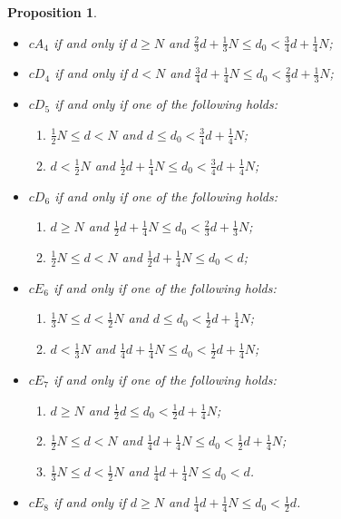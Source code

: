 \documentclass[a4paper,11pt]{amsart}
\newtheorem{prop}[thm]{Proposition}
\theoremstyle{definition}
\theoremstyle{remark}
\numberwithin{equation}{section}
\begin{document}
\begin{prop}
\begin{enumerate}
\begin{itemize}
			\item $cA_4$ if and only if $d \geq N$ and $\frac23d + \frac13 N \le d_0 < \frac34d + \frac14 N$;
            
            \item $cD_4$ if and only if $d<N$ and $\frac{3}{4}d+\frac{1}{4}N\leq d_0<\frac{2}{3}d+\frac{1}{3}N$;
            
            \item $cD_5$ if and only if one of the following holds:
            \begin{enumerate}
                \item $\frac{1}{2}N\leq d<N$ and $d\leq d_0<\frac{3}{4}d+\frac{1}{4}N$;
                \item $d<\frac{1}{2}N$ and $\frac{1}{2}d+\frac{1}{4}N\leq d_0<\frac{3}{4}d+\frac{1}{4}N$; 
            \end{enumerate}
            
			\item $cD_6$ if and only if one of the following holds:
            \begin{enumerate}
                \item $d\geq N$ and $\frac12d + \frac14 N \le d_0 < \frac23d + \frac13 N$;
                \item $\frac{1}{2}N\leq d<N$ and $\frac{1}{2}d+\frac{1}{4}N\leq d_0<d$;
            \end{enumerate}
			
            \item $cE_6$ if and only if one of the following holds:
            \begin{enumerate}
                \item $\frac{1}{3}N\leq d<\frac{1}{2}N$ and $d\leq d_0<\frac{1}{2}d+\frac{1}{4}N$;
                \item $d<\frac{1}{3}N$ and $\frac{1}{4}d+\frac{1}{4}N\leq d_0<\frac{1}{2}d+\frac{1}{4}N$;
            \end{enumerate}
            
			\item $cE_7$ if and only if one of the following holds:
            \begin{enumerate}
                \item $d\geq N$ and $\frac12d \le d_0 < \frac12d + \frac14 N$;
                \item $\frac{1}{2}N\leq d<N$ and $\frac{1}{4}d+\frac{1}{4}N\leq d_0<\frac{1}{2}d+\frac{1}{4}N$;
                \item $\frac{1}{3}N\leq d<\frac{1}{2}N$ and $\frac{1}{4}d+\frac{1}{4}N\leq d_0<d$.
            \end{enumerate}
            
			\item $cE_8$ if and only if $d\geq N$ and $\frac14d + \frac14 N \le d_0 < \frac12d$.
		\end{itemize}
	\end{enumerate}
\end{prop}
\end{document}
